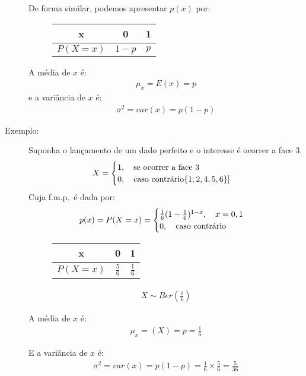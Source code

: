 \begin{description}
 De forma similar, podemos apresentar $p(x)$ por:
 \begin{figure} [H]
   \centering
   \begin{tabular}{c c c}
     \toprule
     x&0&1\\ \midrule
     $P(X=x)$&$1-p$&$p$\\ \bottomrule
   \end{tabular}
   \label{fig:7}
 \end{figure}
 A média de $x$ é: 
 \begin{align}
   \mu_{x}=E(x)=p
 \end{align}
 e a variância de $x$ é: 
 \begin{align}
   \sigma^2 = var(x)=p (1-p)
 \end{align}
 \item [Exemplo:] Suponha o lançamento de um dado perfeito e o interesse é ocorrer a face
 3.
 \begin{align*}
   X=\begin{cases}
     1, \text{\quad se ocorrer a face }3\\
     0, \text{\quad caso contrário}\{1,2,4,5,6\}]
   \end{cases}
 \end{align*}
 Cuja f.m.p.\ é dada por:
 \begin{align}
   p(x)=P(X=x)=\begin{cases}
     \frac{1}{6}(1-\frac{1}{6})^{1-x}, \text{\quad}x=0,1\\
     0, \text{\quad caso contrário}
   \end{cases}
 \end{align}
 \begin{figure} 
   \centering
   \begin{tabular}{c c c}
     \toprule
     x&0&1\\ \midrule
     $P(X=x)$&$\frac{5}{6}$&$\frac{1}{6}$\\ \bottomrule
   \end{tabular}
   \label{fig:8}
 \end{figure}
\begin{align*}
   X \sim Ber(\frac{1}{6})
\end{align*}

 A média de $x$ é: 
 \begin{align*}
   \mu_{x}=(X)=p=\frac{1}{6}
 \end{align*}

 E a variância de $x$ é: 
 \begin{align*}
   \sigma^2= var(x)=p(1-p)=\frac{1}{6} \times \frac{5}{6}=\frac{5}{36}
 \end{align*}
 \end{description}
